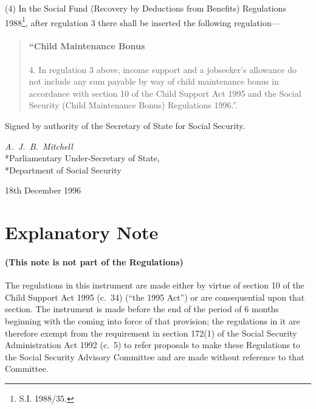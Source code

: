 \documentclass[12pt,a4paper]{article}
\begin{document}
(4) In the Social Fund (Recovery by Deductions from Benefits) Regulations 1988\footnote{\frenchspacing S.I. 1988/35.}, after regulation 3 there shall be inserted the following regulation—
\begin{quotation}
\subsection*{“Child Maintenance Bonus}

4.  In regulation 3 above, income support and a jobseeker’s allowance do not include any sum payable by way of child maintenance bonus in accordance with section 10 of the Child Support Act 1995 and the 
Social Security (Child Maintenance Bonus)  %
Regulations 1996.”.
\end{quotation}


\bigskip

Signed by authority of the Secretary of State for Social Security.

{\raggedleft
\emph{A.\ J.\ B.\ Mitchell}\\*Parliamentary Under-Secretary of
State,\\*Department of Social Security

}

18th December 1996

\small

\part{Explanatory Note}

\renewcommand\parthead{--- Explanatory Note}

\subsection*{(This note is not part of the Regulations)}

The regulations in this instrument are made either by virtue of section 10 of the Child Support Act 1995 (c.\ 34) (“the 1995 Act”) or are consequential upon that section. The instrument is made before the end of the period of 6 months beginning with the coming into force of that provision; the regulations in it are therefore exempt from the requirement in section 172(1) of the Social Security Administration Act 1992 (c.\ 5) to refer proposals to make these Regulations to the Social Security Advisory Committee and are made without reference to that Committee.
\end{document}
